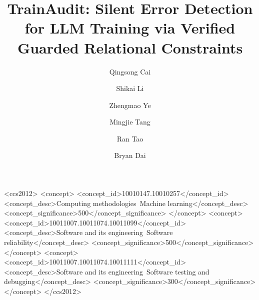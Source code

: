 \documentclass[sigconf,nonacm]{acmart}
\begin{document}
\title[TrainAudit: Silent Error Detection for LLM Training]{TrainAudit: Silent Error Detection for LLM Training via Verified Guarded Relational Constraints}

\author{Qingsong Cai}

\author{Shikai Li}
\authornotemark[1]

\author{Zhengmao Ye}

\author{Mingjie Tang}

\author{Ran Tao}

\author{Bryan Dai}

\begin{CCSXML}
<ccs2012>
   <concept>
       <concept_id>10010147.10010257</concept_id>
       <concept_desc>Computing methodologies~Machine learning</concept_desc>
       <concept_significance>500</concept_significance>
       </concept>
   <concept>
       <concept_id>10011007.10011074.10011099</concept_id>
       <concept_desc>Software and its engineering~Software reliability</concept_desc>
       <concept_significance>500</concept_significance>
       </concept>
   <concept>
       <concept_id>10011007.10011074.10011111</concept_id>
       <concept_desc>Software and its engineering~Software testing and debugging</concept_desc>
       <concept_significance>300</concept_significance>
       </concept>
 </ccs2012>
\end{CCSXML}


\end{document}

